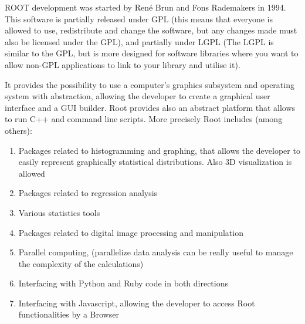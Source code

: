 ROOT development was started by René Brun and Fons Rademakers in 1994. This software is partially released under GPL (this means that everyone is allowed to use, redistribute and change the software, but any changes made must also be licensed under the GPL), and partially under LGPL (The LGPL is similar to the GPL, but is more designed for software libraries where you want to allow non-GPL applications to link to your library and utilise it).

It provides the possibility to use a computer's graphics subsystem and operating system with abstraction, allowing the developer to create a graphical user interface and a GUI builder. Root provides also an abstract platform that allows to run C++ and command line scripts. More precisely Root includes (among others):

\begin{enumerate}

\item Packages related to histogramming and graphing, that allows the developer to easily represent graphically statistical distributions. Also 3D visualization is allowed

\item Packages related to regression analysis

\item Various statistics tools 

\item Packages related to digital image processing and manipulation

\item Parallel computing, (parallelize data analysis can be really useful to manage the complexity of the calculations)

\item Interfacing with Python and Ruby code in both directions

\item Interfacing with Javascript, allowing the developer to access Root functionalities by a Browser

\end{enumerate}
